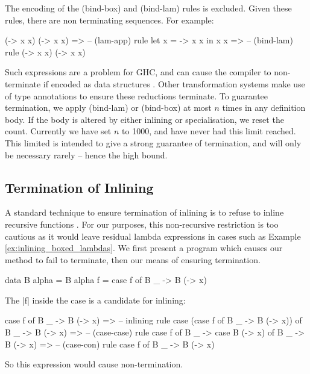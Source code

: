 \documentclass[preprint]{sigplanconf}
\begin{document}
The encoding of the (bind-box) and (bind-lam) rules is excluded. Given these rules, there are non terminating sequences. For example:

\ignore\begin{code}
(\x -> x x) (\x -> x x)
   => -- (lam-app) rule
let x = \x -> x x in x x
   => -- (bind-lam) rule
(\x -> x x) (\x -> x x)
\end{code}

Such expressions are a problem for GHC, and can cause the compiler to non-terminate if encoded as data structures \cite{spj:inlining}. Other transformation systems \cite{chin:higher_order_removal} make use of type annotations to ensure these reductions terminate. To guarantee termination, we apply (bind-lam) or (bind-box) at most $n$ times in any definition body. If the body is altered by either inlining or specialisation, we reset the count. Currently we have set $n$ to 1000, and have never had this limit reached. This limited is intended to give a strong guarantee of termination, and will only be necessary rarely -- hence the high bound.

\subsection{Termination of Inlining}

A standard technique to ensure termination of inlining is to refuse to inline recursive functions \cite{spj:inlining}. For our purposes, this non-recursive restriction is too cautious as it would leave residual lambda expressions in cases such as Example \ref{ex:inlining_boxed_lambdas}. We first present a program which causes our method to fail to terminate, then our means of ensuring termination.

\begin{example}
\begin{code}
data B alpha = B alpha
f = case  f of
          B _ -> B (\x -> x)
\end{code}

The |f| inside the case is a candidate for inlining:

\ignore\begin{code}
case f of B _ -> B (\x -> x)
    => -- inlining rule
case (case f of B _ -> B (\x -> x)) of B _ -> B (\x -> x)
    => -- (case-case) rule
case f of B _ -> case B (\x -> x) of B _ -> B (\x -> x)
    => -- (case-con) rule
case f of B _ -> B (\x -> x)
\end{code}

\noindent So this expression would cause non-termination.
\end{example}
\end{document}
